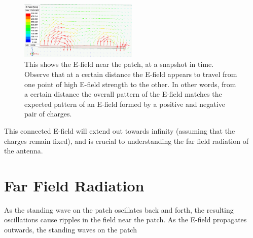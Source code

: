 \documentclass[12pt]{article}
\begin{document}
\begin{figure}[h]
    \centering
    \includegraphics[width=0.5\textwidth]{basic-patch-antenna-near-Efield.png}
    \caption{This shows the E-field near the patch, at a snapshot in time. Observe that at a certain distance the E-field appears to travel from one point of high E-field strength to the other. In other words, from a certain distance the overall pattern of the E-field matches the expected pattern of an E-field formed by a positive and negative pair of charges.}
\end{figure}  
This connected E-field will extend out towards infinity (assuming that the charges remain fixed), and is crucial to understanding the far field radiation of the antenna. 

\section{Far Field Radiation}

As the standing wave on the patch oscillates back and forth, the resulting oscillations cause ripples in the field near the patch. As the E-field propagates outwards, the standing waves on the patch 
\end{document}

